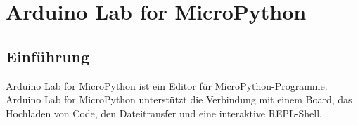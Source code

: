 %
%
%


\chapter{Arduino Lab for MicroPython}

\section{Einführung}

Arduino Lab for MicroPython ist ein Editor für MicroPython-Programme. Arduino Lab for MicroPython unterstützt die Verbindung mit einem Board, das Hochladen von Code, den Dateitransfer und eine interaktive REPL-Shell.

